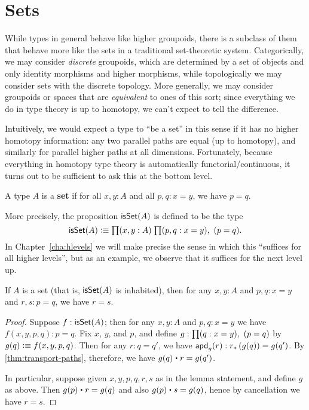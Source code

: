 \section{Sets}
\label{sec:basics-sets}

While types in general behave like higher groupoids, there is a subclass of them that behave more like the sets in a traditional set-theoretic system.
Categorically, we may consider \emph{discrete} groupoids, which are determined by a set of objects and only identity morphisms and higher morphisms, while topologically we may consider sets with the discrete topology.
More generally, we may consider groupoids or spaces that are \emph{equivalent} to ones of this sort; since everything we do in type theory is up to homotopy, we can't expect to tell the difference.

Intuitively, we would expect a type to ``be a set'' in this sense if it has no higher homotopy information: any two parallel paths are equal (up to homotopy), and similarly for parallel higher paths at all dimensions.
Fortunately, because everything in homotopy type theory is automatically functorial/continuous, it turns out to be sufficient to ask this at the bottom level.

\begin{defn}\label{defn:set}
  A type $A$ is a \textbf{set} if for all $x,y:A$ and all $p,q:x=y$, we have $p=q$.
\end{defn}

More precisely, the proposition $\mathsf{isSet}(A)$ is defined to be the type
\[ \isset(A) \defeq \prd{x,y:A}{p,q:x=y} (p=q). \]
In Chapter~\ref{cha:hlevels} we will make precise the sense in which this ``suffices for all higher levels'', but as an example, we observe that it suffices for the next level up.

\begin{lem}\label{thm:isset-is1type}
  If $A$ is a set (that is, $\mathsf{isSet}(A)$ is inhabited), then for any $x,y:A$ and $p,q:x=y$ and $r,s:p=q$, we have $r=s$.
\end{lem}
\begin{proof}
  Suppose $f:\mathsf{isSet}(A)$; then for any $x,y:A$ and $p,q:x=y$ we have $f(x,y,p,q):p=q$.
  Fix $x$, $y$, and $p$, and define $g: \prd{q:x=y} (p=q)$ by $g(q) \vcentcolon\equiv f (x,y,p,q)$.
  Then for any $r:q=q'$, we have $\mathsf{apd}_{g}(r) : {r}_{*}\left({g(q)}\right) = g(q')$.
  By \autoref{thm:transport-paths}, therefore, we have $g(q) \ct r = g(q')$.

  In particular, suppose given $x,y,p,q,r,s$ as in the lemma statement, and define $g$ as above.
  Then $g(p) \ct r = g(q)$ and also $g(p) \ct s = g(q)$, hence by cancellation we have $r=s$.
\end{proof}

